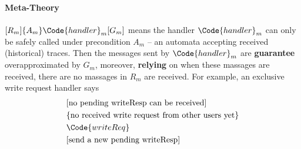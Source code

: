 \paragraph{Meta-Theory} $[R_m]\{A_{m}\}\Code{handler}_m[G_m]$ means the handler $\Code{handler}_m$ can only be safely called under precondition $A_m$ -- an automata accepting received (historical) traces. Then the messages sent by $\Code{handler}_m$ are \textbf{guarantee} overapproximated by $G_m$, moreover, \textbf{relying} on when these massages are received, there are no massages in $R_m$ are received. For example, an exclusive write request handler says
\begin{align*}
    &[\text{no pending writeResp can be received}]
    \\&\{\text{no received write request from other users yet}\}
    \\&\Code{writeReq}
    \\&[\text{send a new pending writeResp}]
\end{align*}